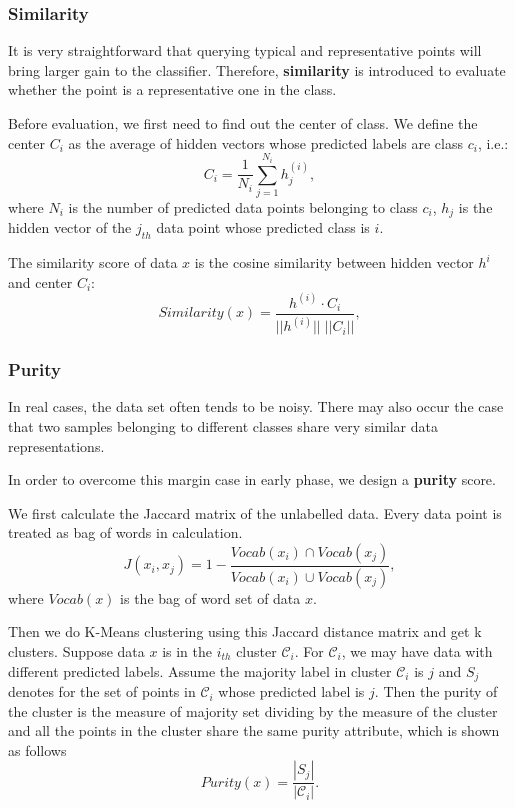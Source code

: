 \subsubsection*{Similarity}
It is very straightforward that querying typical and representative points will bring larger gain to the classifier. Therefore, \textbf{similarity} is introduced to evaluate whether the point is a representative one in the class. 

Before evaluation, we first need to find out the center of class. We define the center $C_i$ as the average of hidden vectors whose predicted labels are class $c_i$, i.e.: 
$$C_i = \frac{1}{N_i} \sum_{j=1}^{N_i} h_j^{(i)},$$
where $N_i$ is the number of predicted data points belonging to class $c_i$, $h_j$ is the hidden vector of the $j_{th}$ data point whose predicted class is $i$.

The similarity score of data $x$ is the cosine similarity between hidden vector $h^i$ and center $C_i$:
$$Similarity(x) = \frac{h^{(i)}\cdot C_i}{||h^{(i)}||\; ||C_i||},$$
\subsubsection*{Purity}
In real cases, the data set often tends to be noisy. There may also occur the case that two samples belonging to different classes share very similar data representations.

In order to overcome this margin case in early phase, we design a \textbf{purity} score. 

We first calculate the Jaccard matrix of the unlabelled data. Every data point is treated as bag of words in calculation.
$$J(x_i,x_j) = 1 - \frac{Vocab(x_i) \cap Vocab(x_j)}{Vocab(x_i) \cup Vocab(x_j)},$$
where $Vocab(x)$ is the bag of word set of data $x$.

Then we do K-Means clustering using this Jaccard distance matrix and get k clusters. Suppose data $x$ is in the $i_{th}$ cluster ${\mathcal{C}}_i$. For ${\mathcal{C}}_i$, we may have data with different predicted labels. Assume the majority label in cluster ${\mathcal{C}}_i$ is $j$ and $S_j$ denotes for the set of points in ${\mathcal{C}}_i$ whose predicted label is $j$. Then the purity of the cluster is the measure of majority set dividing by the measure of the cluster and all the points in the cluster share the same purity attribute, which is shown as follows
$$Purity(x) = \frac{|S_j|}{|{\mathcal{C}}_i|}.$$
